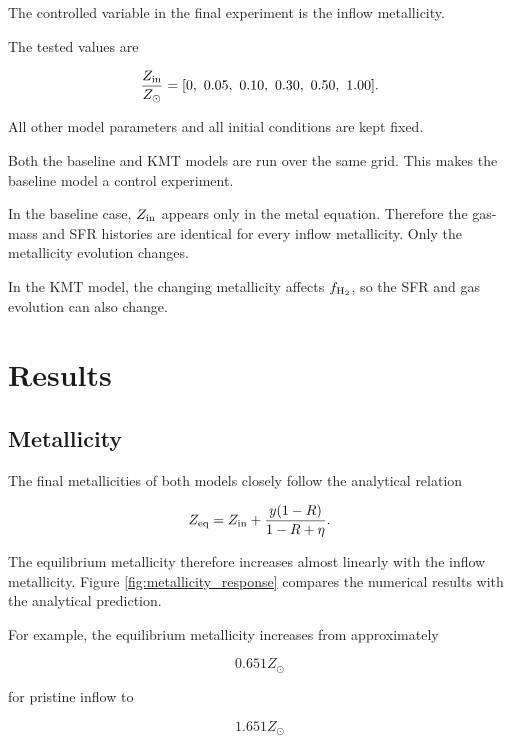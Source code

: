 \documentclass[10pt,a4paper]{article}
\begin{document}
The controlled variable in the final experiment is the inflow metallicity.

The tested values are

\begin{equation}
\frac{Z_{\rm in}}{Z_\odot}
=
[0,\ 0.05,\ 0.10,\ 0.30,\ 0.50,\ 1.00].
\end{equation}

All other model parameters and all initial conditions are kept fixed.

Both the baseline and KMT models are run over the same grid. This makes the baseline model a control experiment.

In the baseline case, \(Z_{\rm in}\) appears only in the metal equation. Therefore the gas-mass and SFR histories are identical for every inflow metallicity. Only the metallicity evolution changes.

In the KMT model, the changing metallicity affects \(f_{\rm H_2}\), so the SFR and gas evolution can also change.

\section{Results}

\subsection{Metallicity}

The final metallicities of both models closely follow the analytical relation

\begin{equation}
Z_{\rm eq}
=
Z_{\rm in}
+
\frac{y(1-R)}
{1-R+\eta}.
\end{equation}

The equilibrium metallicity therefore increases almost linearly with the inflow metallicity. Figure \ref{fig:metallicity_response} compares the numerical results with the analytical prediction.

For example, the equilibrium metallicity increases from approximately

\begin{equation}
0.651Z_\odot
\end{equation}

for pristine inflow to

\begin{equation}
1.651Z_\odot
\end{equation}
\end{document}
